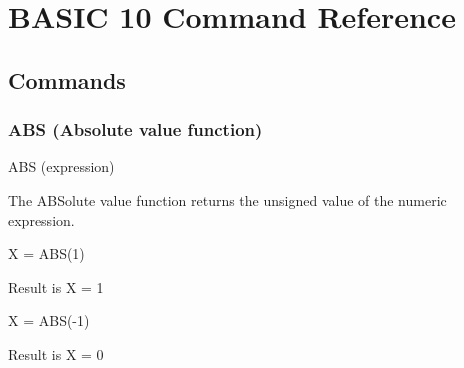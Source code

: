 \chapter{BASIC 10 Command Reference}

\section{Commands}

\subsection{ABS (Absolute value function)}

                           ABS (expression)

The  ABSolute value function returns the unsigned value of the numeric
expression.

\begin{screenoutput}
                X = ABS(1)
\end{screenoutput}
              Result is X = 1
\begin{screenoutput}
                X = ABS(-1) 
\end{screenoutput}
            Result is X = 0


